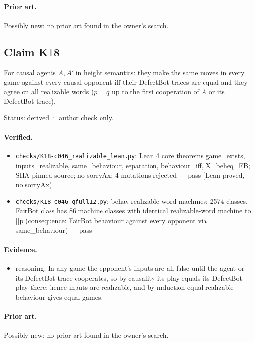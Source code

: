 \documentclass{article}
\begin{document}
\paragraph{Prior art.} Possibly new: no prior art found in the owner's search.

\subsection*{Claim K18}

For causal agents $A,A'$ in height semantics: they make the same moves in every game against every causal opponent iff their DefectBot traces are equal and they agree on all realizable words ($p=q$ up to the first cooperation of $A$ or its DefectBot trace).

Status: derived · author check only.

\paragraph{Verified.}
\begin{itemize}
\item \texttt{checks/K18-c046\_realizable\_lean.py}: Lean 4 core theorems game\_exists, inputs\_realizable, same\_behaviour, separation, behaviour\_iff, X\_beheq\_FB; SHA-pinned source; no sorryAx; 4 mutations rejected --- pass (Lean-proved, no sorryAx)
\item \texttt{checks/K18-c046\_qfull12.py}: behav realizable-word machines: 2574 classes, FairBot class has 86 machine classes with identical realizable-word machine to []p (consequence: FairBot behaviour against every opponent via same\_behaviour) --- pass
\end{itemize}

\paragraph{Evidence.}
\begin{itemize}
\item reasoning: In any game the opponent's inputs are all-false until the agent or its DefectBot trace cooperates, so by causality its play equals its DefectBot play there; hence inputs are realizable, and by induction equal realizable behaviour gives equal games.
\end{itemize}

\paragraph{Prior art.} Possibly new: no prior art found in the owner's search.
\end{document}
